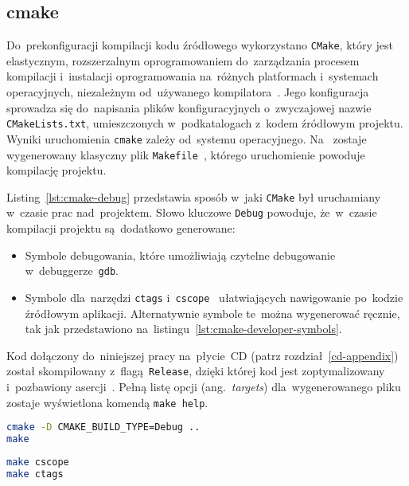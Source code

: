 \documentclass[thesis]{subfiles}
\begin{document}

\subsection{cmake}

Do~prekonfiguracji kompilacji kodu źródłowego wykorzystano \texttt{CMake}, który jest elastycznym, rozszerzalnym oprogramowaniem do~zarządzania procesem kompilacji i~instalacji oprogramowania na~różnych platformach i~systemach operacyjnych, niezależnym od~używanego kompilatora~\cite{cmake}. Jego konfiguracja sprowadza się do~napisania plików konfiguracyjnych o~zwyczajowej nazwie \mbox{\texttt{CMakeLists.txt}}, umieszczonych w~podkatalogach z~kodem źródłowym projektu. Wyniki uruchomienia \texttt{cmake} zależy od~systemu operacyjnego. Na~ zostaje wygenerowany klasyczny plik \texttt{Makefile}~\cite{gnu-makefile-manual}, którego uruchomienie powoduje kompilację projektu.

Listing~\ref{lst:cmake-debug} przedstawia sposób w~jaki \texttt{CMake} był uruchamiany w~czasie prac nad~projektem. Słowo kluczowe \texttt{Debug} powoduje, że~w~czasie kompilacji projektu są~dodatkowo generowane:
\begin{itemize}
\item Symbole debugowania, które umożliwiają czytelne debugowanie w~debuggerze~\texttt{gdb}.
\item Symbole dla~narzędzi \texttt{ctags} i~\texttt{cscope}~\cite{ctags,cscope} ułatwiających nawigowanie po~kodzie źródłowym aplikacji. Alternatywnie symbole te~można wygenerować ręcznie, tak jak przedstawiono na~listingu~\ref{lst:cmake-developer-symbols}.
\end{itemize}
Kod dołączony do~niniejszej pracy na~płycie~CD (patrz rozdział~\ref{cd-appendix}) został skompilowany z~flagą~\texttt{Release}, dzięki której kod jest zoptymalizowany i~pozbawiony asercji~\cite{cmake-compilation-type-manual,cmake-compilation-type-stackoverflow}. Pełną listę opcji (ang.~\emph{targets}) dla~wygenerowanego pliku~ zostaje wyświetlona komendą \texttt{make~help}.

\begin{lstlisting}[label=lst:cmake-debug,language=bash,numbers=none,caption={Uruchomienie \texttt{cmake} w~trybie \texttt{Debug}}]
cmake -D CMAKE_BUILD_TYPE=Debug ..
make
\end{lstlisting}

\begin{lstlisting}[label=lst:cmake-developer-symbols,language=bash,numbers=none,caption={Generowanie symboli dla~narzędzi \texttt{cscope} i~\texttt{ctags}}]
make cscope
make ctags
\end{lstlisting}
\end{document}
